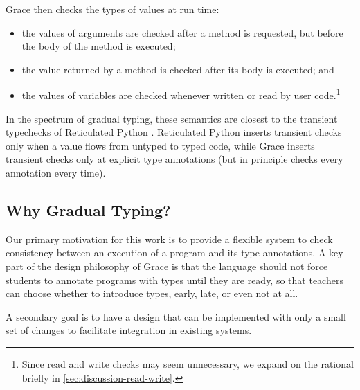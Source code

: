 Grace then checks the types of values at run time:
%
\begin{itemize}
\item the values of arguments are checked after a method is requested, 
      but before the body of the method is executed;
\item the value returned by a method is checked after its body is executed; and
\item the values of variables are checked
      whenever written or read by user code.\footnote{
        Since read and write checks may seem unnecessary,
        we expand on the rational briefly in \cref{sec:discussion-read-write}.
      }
\end{itemize}
%
%
%
%
In the spectrum of gradual typing, these semantics are
closest to the
transient typechecks of Reticulated Python
\cite{reticPython2014,Greenman2018}.
Reticulated Python inserts transient checks only when a value flows from untyped
to typed code, while Grace inserts transient checks only at explicit type
annotations (but in principle checks every annotation every time).



\subsection{Why Gradual Typing?}


Our primary motivation for this work
is to provide a flexible system 
to check consistency between an execution of a program
and its type annotations.
 A key part of the design philosophy of Grace is that the language should not force
 students to annotate programs with types until they are ready, so that
 teachers can choose whether to introduce types, early, late, or even
 not at all. 

A secondary goal is to have a design that can be implemented with
only a small set of changes to facilitate integration in existing systems.


